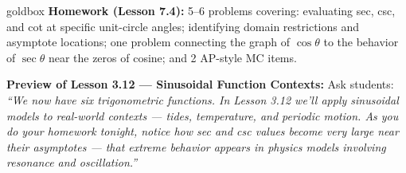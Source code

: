 \documentclass[10pt]{article}
\begin{document}
\vspace{0.08in}

\begin{skillbox}{goldbox}
\textbf{Homework (Lesson 7.4):} 5--6 problems covering: evaluating sec, csc,
and cot at specific unit-circle angles; identifying domain restrictions and
asymptote locations; one problem connecting the graph of $\cos\theta$ to the
behavior of $\sec\theta$ near the zeros of cosine; and 2 AP-style MC items.

\textbf{Preview of Lesson 3.12 --- Sinusoidal Function Contexts:}
Ask students: \textit{``We now have six trigonometric functions. In Lesson 3.12
we'll apply sinusoidal models to real-world contexts --- tides, temperature,
and periodic motion. As you do your homework tonight, notice how sec and csc
values become very large near their asymptotes --- that extreme behavior
appears in physics models involving resonance and oscillation.''}
\end{skillbox}
\end{document}
